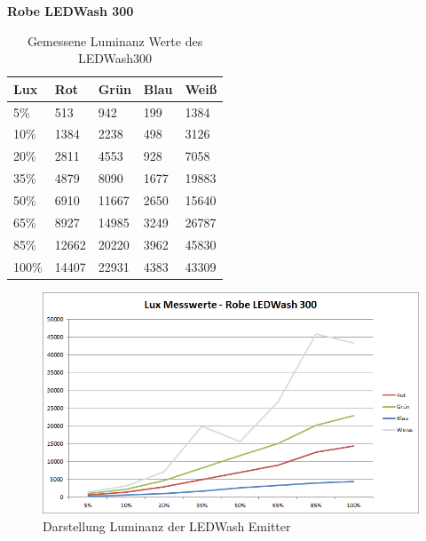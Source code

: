 \documentclass[11pt]{scrartcl}
\begin{document}
\textbf{Robe LEDWash 300}
\begin{table}[H]
    \begin{tabularx}{\textwidth}{|X|X|X|X|X|}
        \hline
        Lux   & Rot   & Grün  & Blau & Weiß \\\hline
        5\%   & 513   & 942   & 199  & 1384 \\\hline
        10\%  & 1384  & 2238  & 498  & 3126 \\\hline
        20\%  & 2811  & 4553  & 928  & 7058 \\\hline
        35\%  & 4879  & 8090  & 1677 & 19883\\\hline
        50\%  & 6910  & 11667 & 2650 & 15640\\\hline
        65\%  & 8927  & 14985 & 3249 & 26787\\\hline
        85\%  & 12662 & 20220 & 3962 & 45830\\\hline
        100\% & 14407 & 22931 & 4383 & 43309\\\hline
    \end{tabularx}
    \caption{Gemessene Luminanz Werte des LEDWash300} \label{table:luxLedWash}
\end{table}
\noindent
\begin{figure}[H]
    \begin{center}
        \includegraphics[width=\textwidth]{images/charts/led_wash_300.png}
    \end{center}
    \caption{Darstellung Luminanz der LEDWash Emitter} \label{fig:luxLedWash}
\end{figure}
\end{document}
